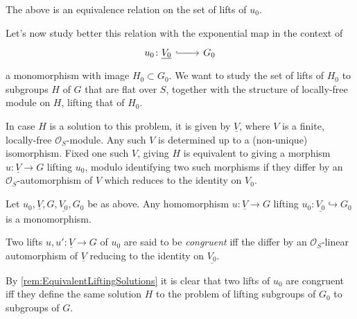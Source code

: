 \begin{rem}[]
	The above is an equivalence relation on the set of lifts of $u_0$.
\end{rem}


\noindent
Let's now study better this relation with the exponential map in the context of
\begin{equation*}
\begin{tikzcd}[row sep = 0ex
	,/tikz/column 1/.append style={anchor=base east}
	,/tikz/column 2/.append style={anchor=base west}]
	u_0\colon \underline{V_0} 
	\arrow[r, "", hookrightarrow] &
	G_0
\end{tikzcd}
\end{equation*} 
a monomorphism with image $H_0 \subset G_0$.
We want to study the set of lifts of $H_0$ to
subgroups $H$ of $G$ that are flat over $S$, together with the structure
of locally-free module on $H$, lifting that of $H_0$.


\begin{rem}\label{rem:EquivalentLiftingSolutions}
	In case $H$ is a solution to this problem, it is given by
	$\underline{V}$, where $V$ is a finite, locally-free $\mathcal{O}_{ S }$-module.
	Any such $V$ is determined up to a (non-unique) isomorphism.
	Fixed one such $V$, giving $H$ is equivalent to giving a morphism
	$u\colon \underline{V} \to G$ lifting $u_0$, modulo identifying
	two such morphisms if they differ by an $\mathcal{O}_{ S }$-automorphism
	of $V$ which reduces to the identity on $V_0$.
\end{rem}


\begin{lem}
	Let $u_0, \underline{V}, G, \underline{V_0}, G_0$ be as above.
	Any homomorphism $u\colon \underline{V} \to G$ lifting 
	$u_0\colon \underline{V_0} \hookrightarrow G_0$
	is a monomorphism.
\end{lem} 


\begin{defn}
	Two lifts $u, u'\colon \underline{V} \to G$ of $u_0$ are said to
	be {\em congruent} iff the differ by an $\mathcal{O}_{ S }$-linear
	automorphism of $\underline{V}$ reducing to the identity on $\underline{V_0}$.
\end{defn}


\begin{rem}[]
	By \cref{rem:EquivalentLiftingSolutions} it is clear that
	two lifts of $u_0$ are congruent iff they define the same solution
	$H$ to the problem of lifting subgroups of $G_0$ to subgroups of $G$.
\end{rem}



